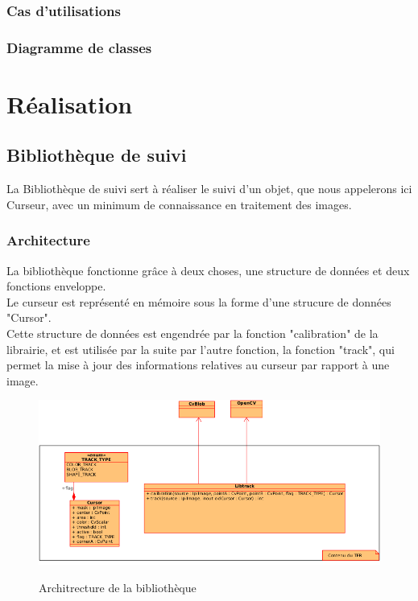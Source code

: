 \documentclass{report}
\begin{document}
			\subsection{Cas d'utilisations}
			\subsection{Diagramme de classes}
	
	\chapter{Réalisation}
		\section{Bibliothèque de suivi}
			La Bibliothèque de suivi sert à réaliser le suivi d'un objet, que nous appelerons ici Curseur, avec un minimum de connaissance en traitement des images.\\
			\subsection{Architecture}
					La bibliothèque fonctionne grâce à deux choses, une structure de données et deux fonctions enveloppe. \\
					Le curseur est représenté en mémoire sous la forme d'une strucure de données "Cursor". \\
					Cette structure de données est engendrée par la fonction "calibration" de la librairie, et est utilisée par la suite par l'autre fonction, la fonction "track", qui permet la mise à jour des informations relatives au curseur par rapport à une image.
					\begin{figure}[!h]
						\centering
						\includegraphics[scale=0.8]{../soutenance/libtrack-uml.png}\\
						\caption{Architrecture de la bibliothèque}
						\label{Architrecture de la bibliothèque}
					\end{figure}
				\newpage
\end{document}
